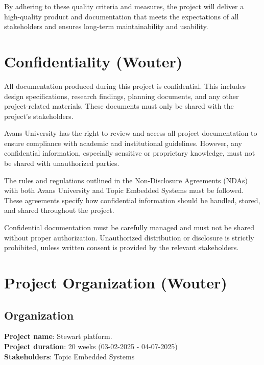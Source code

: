 \documentclass{article}
\begin{document}
By adhering to these quality criteria and measures, the project will deliver a high-quality product and documentation that meets the expectations of all stakeholders and ensures long-term maintainability and usability.

\newpage


\section{Confidentiality (Wouter)}

All documentation produced during this project is confidential. This includes
design specifications, research findings, planning documents, and any other
project-related materials. These documents must only be shared with the
project's stakeholders.

Avans University has the right to review and access all project documentation
to ensure compliance with academic and institutional guidelines. However, any
confidential information, especially sensitive or proprietary knowledge, must
not be shared with unauthorized parties.

The rules and regulations outlined in the Non-Disclosure Agreements (NDAs) with
both Avans University and Topic Embedded Systems must be followed. These
agreements specify how confidential information should be handled, stored, and
shared throughout the project.

Confidential documentation must be carefully managed and must not be shared
without proper authorization. Unauthorized distribution or disclosure is
strictly prohibited, unless written consent is provided by the relevant
stakeholders.

\newpage

\section{Project Organization (Wouter)}


\subsection{Organization}
\textbf{Project name}: Stewart platform.\\ 
\textbf{Project duration}: 20 weeks (03-02-2025 - 04-07-2025)\\ 
\textbf{Stakeholders}: Topic Embedded Systems
\end{document}
